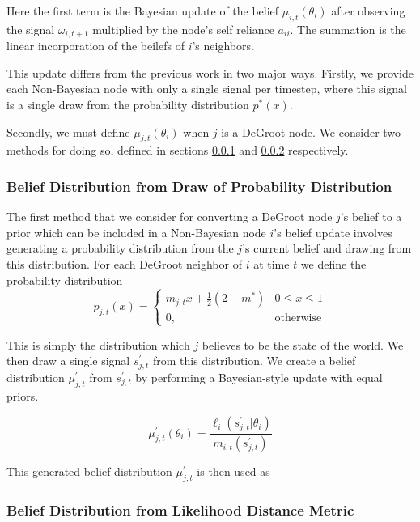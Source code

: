 \documentclass[a4paper,12pt]{article}
\begin{document}
Here the first term is the Bayesian update of the belief $\mu_{i,t}(\theta_i)$ after observing the signal $\omega_{i,t+1}$ multiplied by the node's self reliance $a_{ii}$.  The summation is the linear incorporation of the beilefs of $i$'s neighbors.

This update differs from the previous work in two major ways.  Firstly, we provide each Non-Bayesian node with only a single signal per timestep, where this signal is a single draw from the probability distribution $p^*(x)$.

Secondly, we must define $\mu_{j,t}(\theta_i)$ when $j$ is a DeGroot node.  We consider two methods for doing so, defined in sections \ref{sec:draw_from_degroot} and \ref{sec:likelihood_metric} respectively.

\subsubsection{Belief Distribution from Draw of Probability Distribution}
\label{sec:draw_from_degroot}

The first method that we consider for converting a DeGroot node $j$'s belief to a prior which can be included in a Non-Bayesian node $i$'s belief update involves generating a probability distribution from the $j$'s current belief and drawing from this distribution.  For each DeGroot neighbor of $i$ at time $t$ we define the probability distribution
\begin{equation}
p_{j,t}(x)=\begin{cases}
m_{j,t} x + \frac{1}{2}(2-m^*) & 0 \le x \le 1 \\
0, & \text{otherwise}
\end{cases}
\end{equation}

This is simply the distribution which $j$ believes to be the state of the world.  We then draw a single signal $s_{j,t}^\prime$ from this distribution.  We create a belief distribution $\mu_{j,t}^\prime$ from $s_{j,t}^\prime$ by performing a Bayesian-style update with equal priors.

\begin{equation}
\mu_{j,t}^\prime(\theta_i) = \frac{\ell_i(s_{j,t}^\prime|\theta_i)}{m_{i,t}(s_{j,t}^\prime)}
\end{equation}

This generated belief distribution $\mu_{j,t}^\prime$ is then used as


\subsubsection{Belief Distribution from Likelihood Distance Metric}
\label{sec:likelihood_metric}



\end{document}
